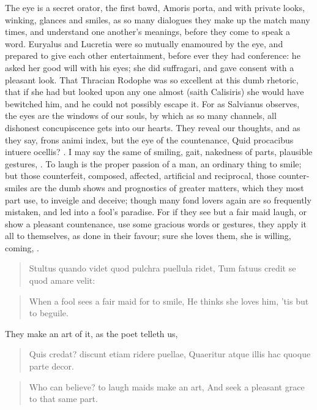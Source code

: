 The eye is a secret orator, the first bawd, Amoris porta, and with
private looks, winking, glances and smiles, as so many dialogues they
make up the match many times, and understand one another's meanings,
before they come to speak a word. Euryalus and Lucretia were so
mutually enamoured by the eye, and prepared to give each other
entertainment, before ever they had conference: he asked her good will
with his eyes; she did suffragari, and gave consent with a pleasant
look. That Thracian Rodophe was so excellent at this dumb
rhetoric, that if she had but looked upon any one almost (saith
Calisiris) she would have bewitched him, and he could not possibly
escape it. For as Salvianus observes, the eyes are the windows of
our souls, by which as so many channels, all dishonest concupiscence
gets into our hearts. They reveal our thoughts, and as they say, frons
animi index, but the eye of the countenance, Quid procacibus
intuere ocellis? \etc{}. I may say the same of smiling, gait, nakedness of
parts, plausible gestures, \etc{}. To laugh is the proper passion of a man,
an ordinary thing to smile; but those counterfeit, composed, affected,
artificial and reciprocal, those counter-smiles are the dumb shows and
prognostics of greater matters, which they most part use, to inveigle
and deceive; though many fond lovers again are so frequently mistaken,
and led into a fool's paradise. For if they see but a fair maid laugh,
or show a pleasant countenance, use some gracious words or gestures,
they apply it all to themselves, as done in their favour; sure she
loves them, she is willing, coming, \etc{}.

\begin{latin}
\begin{verse}%
Stultus quando videt quod pulchra puellula ridet,
Tum fatuus credit se quod amare velit:
\end{verse}%
\end{latin}
\translationrule%
\begin{verse}%
When a fool sees a fair maid for to smile,
He thinks she loves him, 'tis but to beguile.
\end{verse}%

They make an art of it, as the poet telleth us,

\begin{latin}
\begin{verse}%
Quis credat? discunt etiam ridere puellae,
Quaeritur atque illis hac quoque parte decor.
\end{verse}%
\end{latin}
\translationrule%
\begin{verse}%
Who can believe? to laugh maids make an art,
And seek a pleasant grace to that same part.
\end{verse}%

